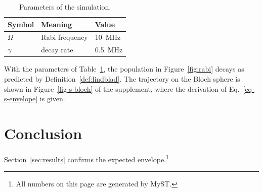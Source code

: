 \documentclass{article}
\begin{document}
\begin{table}
  \centering
  \caption{Parameters of the simulation.}
  \label{tab:params}
  \begin{tabular}{lll}
    \hline
    Symbol & Meaning & Value \\
    \hline
    $\Omega$ & Rabi frequency & \SI{10}{\mega\hertz} \\
    $\gamma$ & decay rate & \SI{0.5}{\mega\hertz} \\
    \hline
  \end{tabular}
\end{table}

With the parameters of Table~\ref{tab:params}, the population in Figure~\ref{fig:rabi}
decays as predicted by Definition~\ref{def:lindblad}. The trajectory on the Bloch sphere is
shown in Figure~\ref{fig-s-bloch} of the supplement, where the derivation of
Eq.~\eqref{eq-s-envelope} is given.

\section{Conclusion}

Section~\ref{sec:results} confirms the expected envelope.\footnote{All numbers on this page are generated by MyST.}
\end{document}
